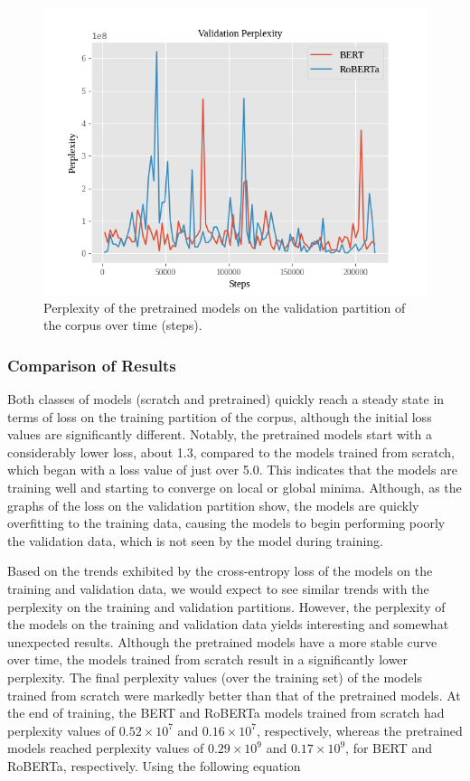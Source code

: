\documentclass[12pt]{article}
\begin{document}
\begin{figure}[!t]
    \includegraphics[width=\linewidth]{figures/pretrained_validation_ppl.png}
    \caption{Perplexity of the pretrained models on the validation partition of the corpus over time (steps).}
    \label{fig:pretrained_validation_ppl}
\end{figure}

\subsubsection{Comparison of Results}\label{sec:results_comparison}
Both classes of models (scratch and pretrained) quickly reach a steady state in terms of loss on the training partition of the corpus, although the
initial loss values are significantly different. Notably, the pretrained models start with a considerably lower loss, about 1.3, compared to the
models trained from scratch, which began with a loss value of just over 5.0. This indicates that the models are training well and starting to converge
on local or global minima. Although, as the graphs of the loss on the validation partition show, the models are quickly overfitting to the training
data, causing the models to begin performing poorly the validation data, which is not seen by the model during training.

Based on the trends exhibited by the cross-entropy loss of the models on the training and validation data, we would expect to see similar trends with
the perplexity on the training and validation partitions. However, the perplexity of the models on the training and validation data yields interesting
and somewhat unexpected results. Although the pretrained models have a more stable curve over time, the models trained from scratch result in a
significantly lower perplexity. The final perplexity values (over the training set) of the models trained from scratch were markedly better than that
of the pretrained models. At the end of training, the BERT and RoBERTa models trained from scratch had perplexity values of $0.52\times 10^7$ and
$0.16\times 10^7$, respectively, whereas the pretrained models reached perplexity values of $0.29\times 10^9$ and $0.17\times 10^9$, for BERT and
RoBERTa, respectively. Using the following equation
\end{document}
